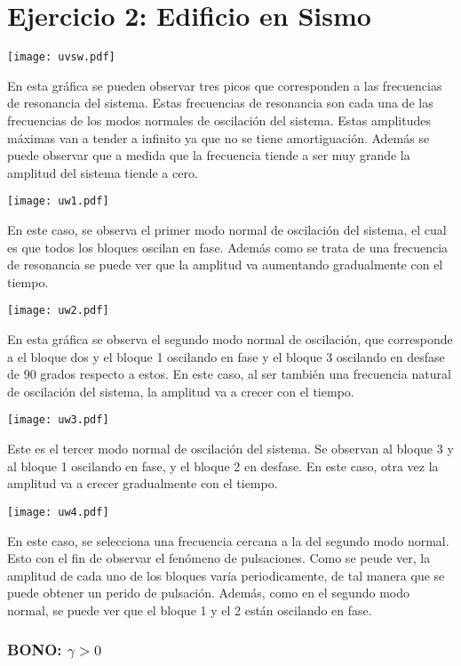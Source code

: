 \documentclass[11pt,letterpaper]{exam}
\begin{document}
\section{Ejercicio 2: Edificio en Sismo}
\begin{center}
\texttt{[image: uvsw.pdf]}
\end{center}
En esta gráfica se pueden observar tres picos que corresponden a las frecuencias de resonancia del sistema. Estas frecuencias de resonancia son cada una de las frecuencias de los modos normales de oscilación del sistema. Estas amplitudes máximas van a tender a infinito ya que no se tiene amortiguación. Además se puede observar que a medida que la frecuencia tiende a ser muy grande la amplitud del sistema tiende a cero.
\begin{center}
\texttt{[image: uw1.pdf]}
\end{center}
En este caso, se observa el primer modo normal de oscilación del sistema, el cual es que todos los bloques oscilan en fase. Además como se trata de una frecuencia de resonancia se puede ver que la amplitud va aumentando gradualmente con el tiempo.
\begin{center}
\texttt{[image: uw2.pdf]}
\end{center}
En esta gráfica se observa el segundo modo normal de oscilación, que corresponde a el bloque dos y el bloque 1 oscilando en fase y el bloque 3 oscilando en desfase de 90 grados respecto a estos. En este caso, al ser también una frecuencia natural de oscilación del sistema, la amplitud va a crecer con el tiempo. 
\begin{center}
\texttt{[image: uw3.pdf]}
\end{center}
Este es el tercer modo normal de oscilación del sistema. Se observan al bloque 3 y al bloque 1 oscilando en fase, y el bloque 2 en desfase. En este caso, otra vez la amplitud va a crecer gradualmente con el tiempo.
\begin{center}
\texttt{[image: uw4.pdf]}
\end{center}
En este caso, se selecciona una frecuencia cercana a la del segundo modo normal. Esto con el fin de observar el fenómeno de pulsaciones. Como se peude ver, la amplitud de cada uno de los bloques varía periodicamente, de tal manera que se puede obtener un perido de pulsación. Además, como en el segundo modo normal, se puede ver que el bloque 1 y el 2 están oscilando en fase.
\subsubsection*{BONO: $\gamma > 0$}
\end{document}
